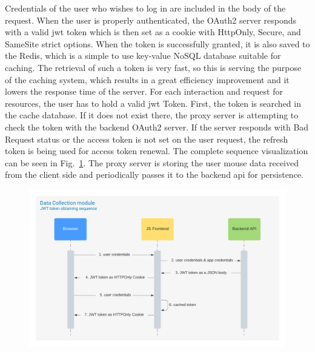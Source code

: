 Credentials of the user who wishes to log in are included in the body of the request.
When the user is properly authenticated, the OAuth2 server responds with a valid \gls{jwt} token which is then set as a cookie with HttpOnly, Secure, and SameSite strict options.
When the token is successfully granted, it is also saved to the Redis, which is a simple to use key-value NoSQL database suitable for caching.
The retrieval of such a token is very fast, so this is serving the purpose of the caching system, which results in a great efficiency improvement and it lowers the response time of the server.
For each interaction and request for resources, the user has to hold a valid \gls{jwt} Token.
First, the token is searched in the cache database.
If it does not exist there, the proxy server is attempting to check the token with the backend OAuth2 server.
If the server responds with Bad Request status or the access token is not set on the user request, the refresh token is being used for access token renewal.
The complete sequence visualization can be seen in \mbox{Fig.~\ref{fig:jwt-sequence}}.
The proxy server is storing the user mouse data received from the client side and periodically passes it to the backend \gls{api} for persistence.


\begin{figure}[!hbt]
    
    \centering
    \includegraphics[width=\linewidth]{resources/jwt_diagram.png}
    \captionsetup{width=\linewidth}
    \label{fig:jwt-sequence}
\end{figure}